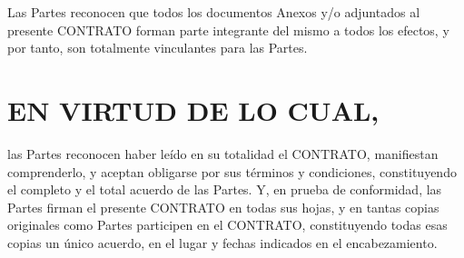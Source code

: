 \documentclass[a4paper,11pt]{report}
\begin{document}
	Las Partes reconocen que todos los documentos Anexos y/o adjuntados al
	presente CONTRATO forman parte integrante del mismo a todos los efectos,
	y por tanto, son totalmente vinculantes para las Partes.

	\section*{EN VIRTUD DE LO CUAL,}
	las Partes reconocen haber leído en su totalidad el CONTRATO, manifiestan
	comprenderlo, y aceptan obligarse por sus términos y condiciones,
	constituyendo el completo y el total acuerdo de las Partes. Y, en prueba de
	conformidad, las Partes firman el presente CONTRATO en todas sus hojas, y en
	tantas copias originales como Partes participen en el CONTRATO, constituyendo
	todas esas copias un único acuerdo, en el lugar y fechas indicados en el
	encabezamiento.
\end{document}
